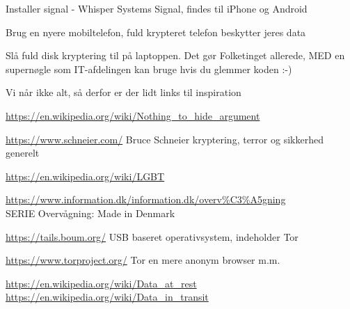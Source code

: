 \documentclass[20pt,landscape,a4paper,footrule]{foils}
\begin{document}



Installer signal - Whisper Systems Signal, findes til iPhone og Android

Brug en nyere mobiltelefon, fuld krypteret telefon beskytter jeres data

Slå fuld disk kryptering til på laptoppen. Det gør Folketinget allerede, MED en supernøgle som IT-afdelingen kan bruge hvis du glemmer koden :-)


\myquestionspage



Vi når ikke alt, så derfor er der lidt links til inspiration

\begin{list2}
\item \url{https://en.wikipedia.org/wiki/Nothing_to_hide_argument}

\item \url{https://www.schneier.com/} Bruce Schneier kryptering, terror og sikkerhed generelt

\item \url{https://en.wikipedia.org/wiki/LGBT}

\item \url{https://www.information.dk/information.dk/overv%C3%A5gning}\\
SERIE Overvågning: Made in Denmark

\item \url{https://tails.boum.org/} USB baseret operativsystem, indeholder Tor

\item \url{https://www.torproject.org/} Tor en mere anonym browser m.m.
\item \url{https://en.wikipedia.org/wiki/Data_at_rest}\\
\url{https://en.wikipedia.org/wiki/Data_in_transit}
\end{list2}
\end{document}
